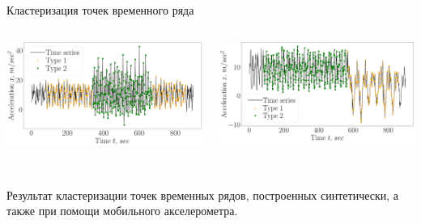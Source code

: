\documentclass[10pt,pdf,hyperref={unicode}]{beamer}
\begin{document}
\begin{frame}[shrink=5]{Кластеризация точек временного ряда}
\begin{columns}
    \begin{column}{0.5\textwidth}
        \includegraphics[width=1\textwidth]{results/real_1_claster_vector}
    \end{column}
    \begin{column}{0.5\textwidth}
        \includegraphics[width=1\textwidth]{results/real_2_claster_vector}
    \end{column}
\end{columns}

~\\
Результат кластеризации точек временных рядов, построенных синтетически, а также при помощи мобильного акселерометра.

\end{frame}
\end{document}
